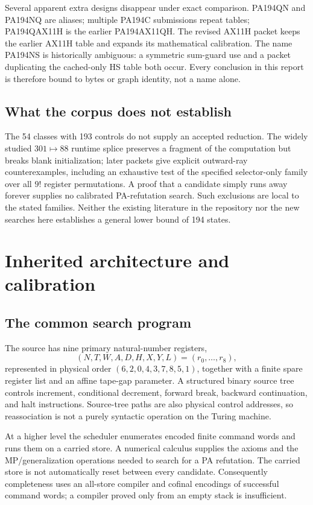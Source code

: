 \documentclass[11pt,a4paper]{article}
\theoremstyle{definition}
\begin{document}
Several apparent extra designs disappear under exact comparison.
PA194QN and PA194NQ are aliases; multiple PA194C submissions repeat
tables; PA194QAX11H is the earlier PA194AX11QH. The revised AX11H packet
keeps the earlier AX11H table and expands its mathematical calibration.
The name PA194NS is historically ambiguous: a symmetric sum-guard use
and a packet duplicating the cached-only HS table both occur. Every
conclusion in this report is therefore bound to bytes or graph identity,
not a name alone.

\subsection{What the corpus does not establish}
The 54 classes with 193 controls do not supply an accepted reduction.
The widely studied $301\mapsto88$ runtime splice preserves a fragment
of the computation but breaks blank initialization; later packets give
explicit outward-ray counterexamples, including an exhaustive test of
the specified selector-only family over all $9!$ register permutations.
A proof that a candidate simply runs away forever supplies no calibrated
PA-refutation search. Such exclusions are local to the stated families.
Neither the existing literature in the repository nor the new searches
here establishes a general lower bound of 194 states.

\section{Inherited architecture and calibration}

\subsection{The common search program}
The source has nine primary natural-number registers,
\[
 (N,T,W,A,D,H,X,Y,L)=(r_0,\ldots,r_8),
\]
represented in physical order $(6,2,0,4,3,7,8,5,1)$, together with a
finite spare register list and an affine tape-gap parameter. A structured
binary source tree controls increment, conditional decrement, forward
break, backward continuation, and halt instructions. Source-tree paths
are also physical control addresses, so reassociation is not a purely
syntactic operation on the Turing machine.

At a higher level the scheduler enumerates encoded finite command words
and runs them on a carried store. A numerical calculus supplies the
axioms and the MP/generalization operations needed to search for a PA
refutation. The carried store is not automatically reset between every
candidate. Consequently completeness uses an all-store compiler and
cofinal encodings of successful command words; a compiler proved only
from an empty stack is insufficient.
\end{document}
